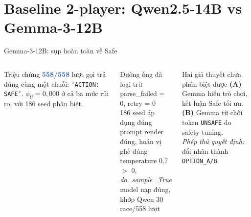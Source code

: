 \documentclass[9pt,aspectratio=169]{beamer}
\newcommand{\bad}[1]{\textcolor{highlight}{\textbf{#1}}}
\newcommand{\good}[1]{\textcolor{proposegreen}{\textbf{#1}}}
\newcommand{\cmark}{\ding{51}}
\begin{document}
\section{Baseline 2-player: Qwen2.5-14B vs Gemma-3-12B}

\begin{frame}{Gemma-3-12B: sụp hoàn toàn về Safe}
\begin{columns}[T]
\begin{alertblock}{Triệu chứng}
\small \bad{558/558} lượt gọi trả đúng cùng một chuỗi: \texttt{`ACTION: SAFE'}. $\phi_U = 0{,}000$ ở cả ba mức rủi ro, với 186 seed phân biệt.
\end{alertblock}
\begin{block}{Đường ống đã loại trừ}
\scriptsize
\good{\cmark} parse\_failed = 0, retry = 0\\
\good{\cmark} 186 seed áp dụng đúng\\
\good{\cmark} prompt render đúng, hoán vị ghế đúng\\
\good{\cmark} temperature 0,7 $>$ 0, \textit{do\_sample=True}\\
\good{\cmark} model nạp đúng, khớp Qwen 30 race/558 lượt
\end{block}
\centering
{}
\vspace{0.4em}
\begin{exampleblock}{Hai giả thuyết chưa phân biệt được}
\scriptsize
\textbf{(A)} Gemma hiểu trò chơi, kết luận Safe tối ưu.\\
\textbf{(B)} Gemma từ chối token \texttt{UNSAFE} do safety-tuning.\\
\textit{Phép thử quyết định:} đổi nhãn thành \texttt{OPTION\_A/B}.
\end{exampleblock}
\end{columns}
\end{frame}
\end{document}
